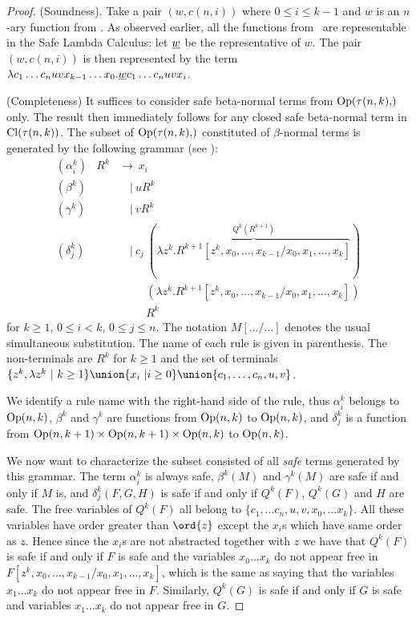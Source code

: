\begin{proof}
  (Soundness). Take a pair $(w,c(n,i))$ where
  $0\leq i\leq k-1$ and $w$ is an $n$-ary function from \safedefset.
  As observed earlier, all the functions from \safedefset\ are representable
  in the Safe Lambda Calculus: let $\underline{w}$ be the representative of $w$.
  The pair $(w,c(n,i))$ is then represented by the term
  $ \lambda c_1 \ldots c_n u v x_{k-1} \ldots x_0 . \underline{w} c_1\ldots c_n u v x_i$.
\smallskip

(Completeness) It suffices to consider safe beta-normal terms from
$\openedof{\tau(n,k)}$ only. The result then immediately follows for
any closed safe beta-normal term in ${\rm Cl}(\tau(n,k))$. The
subset of $\openedof{\tau(n,k)}$ constituted of $\beta$-normal terms
is generated by the following grammar (see
\cite{DBLP:journals/tcs/Zaionc87}):
\begin{eqnarray*}
  (\alpha_i^k) &R^k &\rightarrow\ x_i \\
  (\beta^k) && \quad|\  u R^k \\
  (\gamma^k) && \quad|\  v R^k \\
  (\delta^k_j) && \quad|\  c_j\ (\overbrace{\lambda z^k. R^{k+1}[z^k,x_0,\ldots, x_{k-1}/x_0,x_1, \ldots, x_k]}^{Q^k(R^{k+1})}) \\
  && \quad\  \quad \ (\lambda z^k. R^{k+1}[z^k,x_0,\ldots, x_{k-1}/x_0,x_1, \ldots, x_k]) \\
  && \quad\  \quad \ R^k
\end{eqnarray*}
for $k\geq 1$, $0\leq i< k$, $0\leq j\leq n$. The notation
$M[\ldots/\ldots]$ denotes the usual simultaneous substitution. The
name of each rule is given in parenthesis. The non-terminals are
$R^k$ for $k\geq1$ and the set of terminals $\{ z^k, \lambda z^k \
|\ k\geq 1\} \union \{ x_i ~| i\geq 0 \} \union \{ c_1, \ldots, c_n,
u, v \}$.

We identify a rule name with the right-hand side of the rule, thus
$\alpha_i^k$ belongs to ${\rm Op}(n,k)$, $\beta^k$ and $\gamma^k$
are functions from ${\rm Op}(n,k)$ to ${\rm Op}(n,k)$, and
$\delta^k_j$ is a function from ${\rm Op}(n,k+1) \times
{\rm Op}(n,k+1) \times {\rm Op}(n,k)$ to ${\rm Op}(n,k)$.

We now want to characterize the subset consisted of all \emph{safe}
terms generated by this grammar. The term $\alpha_i^k$ is always
safe, $\beta^k(M)$ and $\gamma^k(M)$ are safe if and only if $M$ is,
and  $\delta^k_j(F,G,H)$ is safe if and only if $Q^k(F)$, $Q^k(G)$
and $H$ are safe. The free variables of $Q^k(F)$ all belong to $\{
c_1, \ldots c_n, u, v, x_0,\ldots x_{k}\}$. All these variables have
order greater than $\ord{z}$ except the $x_i$s which have same order
as $z$. Hence since the $x_i$s are not abstracted together with $z$
we have that $Q^k(F)$ is safe if and only if $F$ is safe and the
variables $x_0\ldots x_k$ do not appear free in $F[z^k,x_0,\ldots,
x_{k-1}/x_0,x_1, \ldots, x_k]$, which is the same as saying that the
variables $x_1\ldots x_k$ do not appear free in $F$. Similarly,
$Q^k(G)$ is safe if and only if $G$ is safe and variables $x_1\ldots
x_k$ do not appear free in $G$.


\end{proof}
